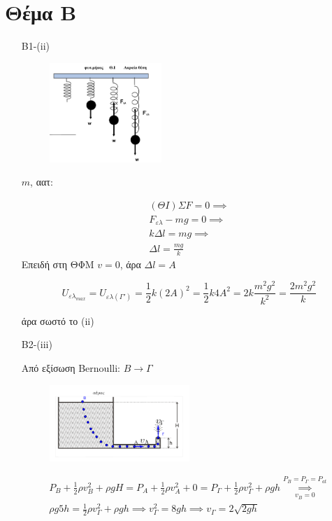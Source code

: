 \documentclass[12pt]{article}
\begin{document}
  \section*{Θέμα Β}
  \begin{enumerate}
    \item [B1-(ii)]

    \begin{figure}[h]
      \includegraphics[width=0.4\textwidth]{ΦυσικήΒ1.png}
      \centering
    \end{figure}

    $m$, αατ:

    \begin{gather*}
    (ΘΙ) ΣF=0 \implies \\ F_{ελ}-mg=0 \implies \\ kΔl=mg \implies \\ Δl=\frac{mg}{k}
    \end{gather*}
    Επειδή στη ΘΦΜ $v=0$, άρα $Δl=A$

    $$U_{ελ_{max}}= U_{ελ(Γ')}=\frac{1}{2}k\left(2A\right)^2=\frac{1}{2}k4A^2=2k\frac{m^2g^2}{k^2}=\frac{2m^2g^2}{k}$$

    άρα σωστό το (ii)

    \item [B2-(iii)]

    Από εξίσωση Bernoulli: $Β\to Γ$
    \begin{figure}[h]
      \includegraphics[width=0.5\textwidth]{ΦυσικήΒ2.png}
      \centering
    \end{figure}

    \begin{gather*}
      P_B + \frac{1}{2}ρv_Β^2+ρgH=P_Α+\frac{1}{2}ρv_Α^2+0=
      P_Γ+\frac{1}{2}ρv_Γ^2+ρgh\overset{P_Β=P_Γ=P_{at}}{\underset{v_Β=0}{\implies}}\\
      ρg5h=\frac{1}{2}ρv_Γ^2+ρgh\implies v_Γ^2=8gh\implies v_Γ=2\sqrt{2gh}
    \end{gather*}


\end{enumerate}
\end{document}
